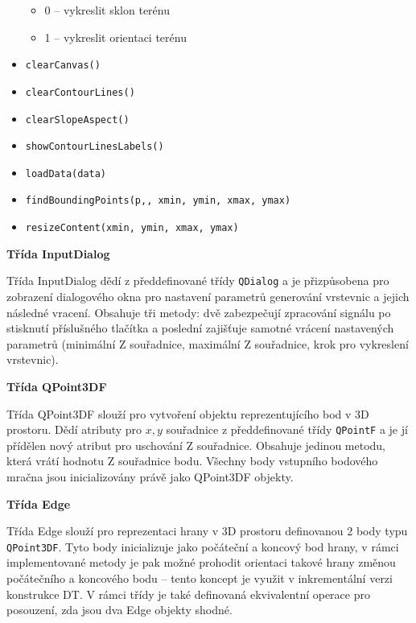 \begin{itemize}
{\begin{itemize}
            \item[] 0 – vykreslit sklon terénu
            \item[] 1 – vykreslit orientaci terénu
        \end{itemize}}
    \item \verb|clearCanvas()|
    \item \verb|clearContourLines()|
    \item \verb|clearSlopeAspect()|
    \item \verb|showContourLinesLabels()|
    \item \verb|loadData(data)|
    \item \verb|findBoundingPoints(p,, xmin, ymin, xmax, ymax)|
    \item \verb|resizeContent(xmin, ymin, xmax, ymax)|
\end{itemize}
\bigbreak
\par {\large\textbf{Třída InputDialog} }
\par Třída InputDialog dědí z předdefinované třídy \verb|QDialog| a je přizpůsobena pro zobrazení dialogového okna pro nastavení parametrů generování vrstevnic a jejich následné vracení. Obsahuje tři metody: dvě zabezpečují zpracování signálu po stisknutí příslušného tlačítka a poslední zajišťuje samotné vrácení nastavených parametrů (minimální Z souřadnice, maximální Z souřadnice, krok pro vykreslení vrstevnic). 
\bigbreak
\par {\large\textbf{Třída QPoint3DF} }
\par Třída QPoint3DF slouží pro vytvoření objektu reprezentujícího bod v 3D prostoru. Dědí atributy pro $x, y$ souřadnice z předdefinované třídy \verb|QPointF| a je jí přídělen nový atribut pro uschování Z souřadnice. Obsahuje jedinou metodu, která vrátí hodnotu Z souřadnice bodu. Všechny body vstupního bodového mračna jsou inicializovány právě jako QPoint3DF objekty.
\bigbreak
\par {\large\textbf{Třída Edge} }
\par Třída Edge slouží pro reprezentaci hrany v 3D prostoru definovanou 2 body typu \verb|QPoint3DF|. Tyto body inicializuje jako počáteční a koncový bod hrany, v rámci implementované metody je pak možné prohodit orientaci takové hrany změnou počátečního a koncového bodu – tento koncept je využit v inkrementální verzi konstrukce DT. V rámci třídy je také definovaná ekvivalentní operace pro posouzení, zda jsou dva Edge objekty shodné.
